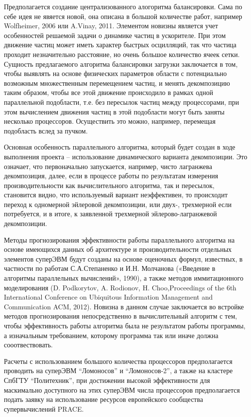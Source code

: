         Предполагается создание централизованного алогоритма балансировки. Сама по себе идея не явяется новой, она описана в большой количестве работ, например Wolfheimer, 2006 или A.Vinay, 2011. Элементом новизны является учет особенностей решаемой задачи о динамике частиц в ускорителе. При этом движение частиц может иметь характер быстрых осцилляций, так что частица проходит незначительно расстояние, но очень большое количество ячеек сетки. Сущность предлагаемого алгоритма балансировки загрузки заключается в том, чтобы выявлять на основе физических параметров области с потенциально возможным множественным перемещением частиц, и менять декомпозицию таким образом, чтобы все этой движение происходило в рамках одной параллельной подобласти, т.е. без пересылок частиц между процессорами, при этом вычислением движения частиц в этой подобласти могут быть заняты несколько процессоров. Осуществить это можно, например, перемещая подобласть вслед за пучком.
        
        Основная особенность параллельного алгоритма, который будет создан в ходе выполнения проекта – использование динамического варианта декомпозиции. Это означает, что первоначально запускается, например, чисто лагранжева декомпозиция, далее, если в процессе работы по результатам измерения производительности как вычислительного алгоритма, так и пересылок, становится видно, что используемый вариант неэффективен, то происходит переход к одномерной эйлеровой декомпозиции, или двух-, трехмерной если
        потребуется, и в итоге, к заявленной трехмерной эйлерово-лагранжевой декомпозиции.
        
        Методы прогнозирования эффективности работы параллельного алгоритма на основе имеющихся данных об архитектуре и производительности отдельных элементов суперЭВМ будут созданы на основе оценочных формул, известных, в частности по работам С.А.Степаненко \cite{StepanenkoScaling} и И.Н. Молчанова («Введение в алгоритмы параллельных вычислений», 1990), а также методов иммитационного моделирования (D. Podkorytov, A. Rodionov, H. Choo,Proceedings of the 6th International Conference on Ubiquitous Information Management and Communication ACM, 2012). Новизна в данном случае заключается во встройке методов прогнозирования непосредственно в вычислительный алгоритм с тем, чтобы эффективность работы алгоритма была не результатом работы программы, а изначальным требованием, которому программа так или иначе должна сооотвествовать.
        
        Расчеты с использованием большого количества процессоров предполагается проводить на суперЭВМ “Ломоносов” и “Ломоносов-2”, а также на кластере СпбГТУ “Политехник”, при достижении высокой эффективности для маскимально доступного на этих суперЭВМ числа процессоров предполагается подать заявку на использование ресурсов европейского сообщества супервычислений PRACE.
        
